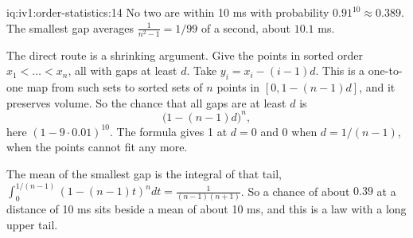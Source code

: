 \begin{solution}{iq:iv1:order-statistics:14}
No two are within 10 ms with probability $0.91^{10} \approx 0.389$. The smallest gap averages $\frac{1}{n^2 - 1} = 1/99$ of a second, about $10.1$ ms.

The direct route is a shrinking argument. Give the points in sorted order $x_1 < \dots < x_n$, all with gaps at least $d$. Take $y_i = x_i - (i - 1)d$. This is a one-to-one map from such sets to sorted sets of $n$ points in $[0, 1 - (n - 1)d]$, and it preserves volume. So the chance that all gaps are at least $d$ is
\[
\bigl(1 - (n - 1)d\bigr)^n,
\]
here $(1 - 9 \cdot 0.01)^{10}$. The formula gives 1 at $d = 0$ and 0 when $d = 1/(n - 1)$, when the points cannot fit any more.

The mean of the smallest gap is the integral of that tail, $\int_0^{1/(n - 1)} (1 - (n - 1)t)^n dt = \frac{1}{(n - 1)(n + 1)}$. So a chance of about $0.39$ at a distance of 10 ms sits beside a mean of about 10 ms, and this is a law with a long upper tail.

\end{solution}

